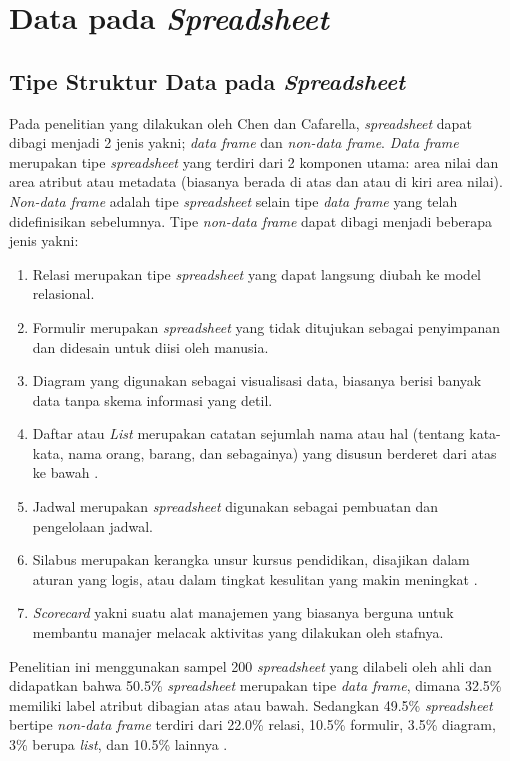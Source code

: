 \section{Data pada \textit{Spreadsheet}}

\subsection{Tipe Struktur Data pada \textit{Spreadsheet}}
Pada penelitian yang dilakukan oleh Chen dan Cafarella, \textit{spreadsheet} dapat dibagi menjadi 2 jenis yakni; \textit{data frame} dan \textit{non-data frame}. \textit{Data frame} merupakan tipe \textit{spreadsheet} yang terdiri dari 2 komponen utama: area nilai dan area atribut atau metadata (biasanya berada di atas dan atau di kiri area nilai). \textit{Non-data frame} adalah tipe \textit{spreadsheet} selain tipe \textit{data frame} yang telah didefinisikan sebelumnya. Tipe \textit{non-data frame} dapat dibagi menjadi beberapa jenis yakni:

    \begin{enumerate}
        \item Relasi merupakan tipe \textit{spreadsheet} yang dapat langsung diubah ke model relasional.
        \item Formulir merupakan \textit{spreadsheet} yang tidak ditujukan sebagai penyimpanan dan didesain untuk diisi oleh manusia.
        \item Diagram yang digunakan sebagai visualisasi data, biasanya berisi banyak data tanpa skema informasi yang detil.
        \item Daftar atau \textit{List} merupakan catatan sejumlah nama atau hal (tentang kata-kata, nama orang, barang, dan sebagainya) yang disusun berderet dari atas ke bawah \citep{pusat1991kamus}.
        \item Jadwal merupakan \textit{spreadsheet} digunakan sebagai pembuatan dan pengelolaan jadwal.
        \item Silabus merupakan kerangka unsur kursus pendidikan, disajikan dalam aturan yang logis, atau dalam tingkat kesulitan yang makin meningkat \citep{pusat1991kamus}.
        \item \textit{Scorecard} yakni suatu alat manajemen yang biasanya berguna untuk membantu manajer melacak aktivitas yang dilakukan oleh stafnya.
    \end{enumerate}

Penelitian ini menggunakan sampel 200 \textit{spreadsheet} yang dilabeli oleh ahli dan didapatkan bahwa 50.5\% \textit{spreadsheet} merupakan tipe \textit{data frame}, dimana 32.5\% memiliki label atribut dibagian atas atau bawah. Sedangkan 49.5\% \textit{spreadsheet} bertipe \textit{non-data frame} terdiri dari 22.0\% relasi, 10.5\% formulir, 3.5\% diagram, 3\% berupa \textit{list}, dan 10.5\% lainnya \citep{Chen2013}.

